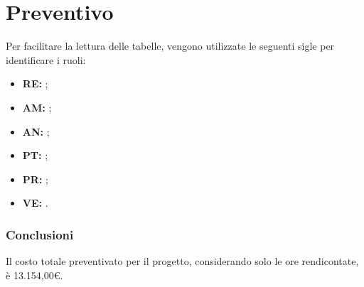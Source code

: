 \section{Preventivo}

Per facilitare la lettura delle tabelle, vengono utilizzate le seguenti sigle per identificare i ruoli:

\begin{itemize}
\item \textbf{RE:} \respProg;
\item \textbf{AM:} \ammProg;
\item \textbf{AN:} \analProg;
\item \textbf{PT:} \progetProg;
\item \textbf{PR:} \programProg;
\item \textbf{VE:} \verifProg.
\end{itemize}







\subsubsection{Conclusioni}

Il costo totale preventivato per il progetto, considerando solo le ore rendicontate, è 13.154,00\euro{}.

